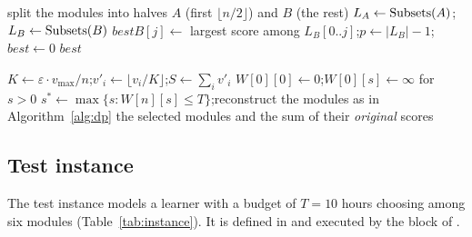 \begin{algorithm}[htbp]
\caption{Meet-in-the-Middle ()}\label{alg:mitm}
split the modules into halves $A$ (first $\lfloor n/2\rfloor$) and $B$ (the rest)\;
$L_A\leftarrow\mathrm{Subsets}(A)$;\quad $L_B\leftarrow\mathrm{Subsets}(B)$\;
$bestB[j]\leftarrow$ largest score among $L_B[0..j]$;\quad $p\leftarrow |L_B|-1$;\quad $best\leftarrow0$\;
\Return $best$\;
\end{algorithm}

\begin{algorithm}[htbp]
\caption{FPTAS by profit scaling ()}\label{alg:fptas}
$K\leftarrow\varepsilon\cdot v_{\max}/n$;\quad $v'_i\leftarrow\lfloor v_i/K\rfloor$;\quad $S\leftarrow\sum_i v'_i$\;
$W[0][0]\leftarrow0$;\quad $W[0][s]\leftarrow\infty$ for $s>0$ 
$s^*\leftarrow\max\{s : W[n][s]\le T\}$;\quad reconstruct the modules as in Algorithm~\ref{alg:dp}\;
\Return the selected modules and the sum of their \emph{original} scores\;
\end{algorithm}

\FloatBarrier
\subsection{Test instance}\label{sec:testinstance}

The test instance models a learner with a budget of $T=10$ hours choosing among six modules (Table~\ref{tab:instance}). It is defined in  and executed by the block  of .

